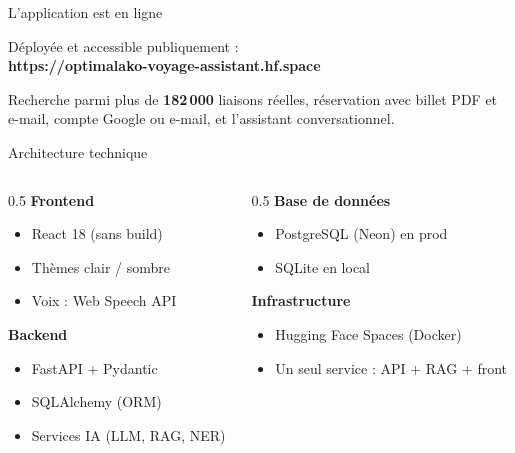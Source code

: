 \documentclass[aspectratio=169,11pt]{beamer}
\begin{document}
\begin{frame}{L'application est en ligne}
  \begin{center}
    \vspace{0.3cm}
    {\Large Déployée et accessible publiquement :}\\[0.4cm]
    {\large\color{accent}\bfseries https://optimalako-voyage-assistant.hf.space}\\[0.8cm]
    \begin{minipage}{0.8\linewidth}\centering\color{soft}
      Recherche parmi plus de \textbf{182\,000} liaisons réelles, réservation avec
      billet PDF et e-mail, compte Google ou e-mail, et l'assistant conversationnel.
    \end{minipage}
  \end{center}
\end{frame}

\begin{frame}{Architecture technique}
  \begin{columns}[T]
    \begin{column}{0.5\linewidth}
      \textbf{\color{dark}Frontend}
      \begin{itemize}\small
        \item React 18 (sans build)
        \item Thèmes clair / sombre
        \item Voix : Web Speech API
      \end{itemize}
      \vspace{0.3cm}
      \textbf{\color{dark}Backend}
      \begin{itemize}\small
        \item FastAPI + Pydantic
        \item SQLAlchemy (ORM)
        \item Services IA (LLM, RAG, NER)
      \end{itemize}
    \end{column}
    \begin{column}{0.5\linewidth}
      \textbf{\color{dark}Base de données}
      \begin{itemize}\small
        \item PostgreSQL (Neon) en prod
        \item SQLite en local
      \end{itemize}
      \vspace{0.3cm}
      \textbf{\color{dark}Infrastructure}
      \begin{itemize}\small
        \item Hugging Face Spaces (Docker)
        \item Un seul service : API + RAG + front
      \end{itemize}
    \end{column}
  \end{columns}
\end{frame}
\end{document}
